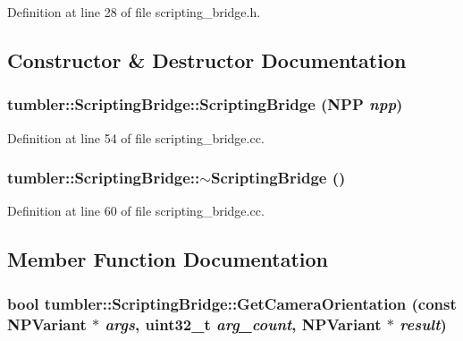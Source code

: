 Definition at line 28 of file scripting\_\-bridge.h.



\subsection{Constructor \& Destructor Documentation}
\hypertarget{classtumbler_1_1_scripting_bridge_aa7abb8784b22a793d795e872841b4bac}{
\subsubsection[{ScriptingBridge}]{\setlength{\rightskip}{0pt plus 5cm}tumbler::ScriptingBridge::ScriptingBridge ({\bf NPP} {\em npp})}}
\label{classtumbler_1_1_scripting_bridge_aa7abb8784b22a793d795e872841b4bac}


Definition at line 54 of file scripting\_\-bridge.cc.

\hypertarget{classtumbler_1_1_scripting_bridge_abe0d3eec9a772e0bc7f906cbc432d58d}{
\subsubsection[{$\sim$ScriptingBridge}]{\setlength{\rightskip}{0pt plus 5cm}tumbler::ScriptingBridge::$\sim$ScriptingBridge ()}}
\label{classtumbler_1_1_scripting_bridge_abe0d3eec9a772e0bc7f906cbc432d58d}


Definition at line 60 of file scripting\_\-bridge.cc.



\subsection{Member Function Documentation}
\hypertarget{classtumbler_1_1_scripting_bridge_ace2d208ee47d10881e48945a1b9deb1e}{
\subsubsection[{GetCameraOrientation}]{\setlength{\rightskip}{0pt plus 5cm}bool tumbler::ScriptingBridge::GetCameraOrientation (const {\bf NPVariant} $\ast$ {\em args}, \/  uint32\_\-t {\em arg\_\-count}, \/  {\bf NPVariant} $\ast$ {\em result})}}
\label{classtumbler_1_1_scripting_bridge_ace2d208ee47d10881e48945a1b9deb1e}


